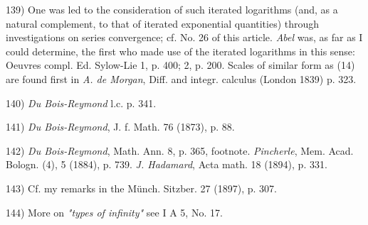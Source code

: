 \vfil
\leftline{\rule{2in}{0.4pt}}
\vspace{0.1cm}
{
\footnotesize
139) One was led to the consideration of such iterated logarithms (and, as a natural complement, to that of iterated exponential quantities) through investigations on series convergence; cf. No. 26 of this article. \textit{Abel} was, as far as I could determine, the first who made use of the iterated logarithms in this sense: Oeuvres compl. Ed. Sylow-Lie 1, p. 400; 2, p. 200. Scales of similar form as (14) are found first in \textit{A. de Morgan}, Diff. and integr. calculus (London 1839) p. 323.

140) \textit{Du Bois-Reymond} l.c. p. 341.

141) \textit{Du Bois-Reymond}, J. f. Math. 76 (1873), p. 88.

142) \textit{Du Bois-Reymond}, Math. Ann. 8, p. 365, footnote. \textit{Pincherle}, Mem. Acad. Bologn. (4), 5 (1884), p. 739. \textit{J. Hadamard}, Acta math. 18 (1894), p. 331.

143) Cf. my remarks in the Münch. Sitzber. 27 (1897), p. 307.

144) More on \textit{"types of infinity"} see I A 5, No. 17.

}